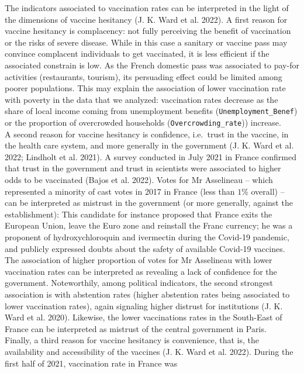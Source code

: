 \documentclass[
]{article}
\begin{document}
The indicators associated to vaccination rates can be interpreted in the
light of the dimensions of vaccine hesitancy (J. K. Ward et al. 2022). A
first reason for vaccine hesitancy is complacency: not fully perceiving
the benefit of vaccination or the risks of severe disease. While in this
case a sanitary or vaccine pass may convince complacent individuals to
get vaccinated, it is less efficient if the associated constrain is low.
As the French domestic pass was associated to pay-for activities
(restaurants, tourism), its persuading effect could be limited among
poorer populations. This may explain the association of lower
vaccination rate with poverty in the data that we analyzed: vaccination
rates decrease as the share of local income coming from unemployment
benefits (\texttt{Unemployment\_Benef}) or the proportion of overcrowded
households (\texttt{Overcrowding\_rate})) increase.\\
A second reason for vaccine hesitancy is confidence, i.e.~trust in the
vaccine, in the health care system, and more generally in the government
(J. K. Ward et al. 2022; Lindholt et al. 2021). A survey conducted in
July 2021 in France confirmed that trust in the government and trust in
scientists were associated to higher odds to be vaccinated (Bajos et al.
2022). Votes for Mr Asselineau -- which represented a minority of cast
votes in 2017 in France (less than \(1\%\) overall) -- can be
interpreted as mistrust in the government (or more generally, against
the establishment): This candidate for instance proposed that France
exits the European Union, leave the Euro zone and reinstall the Franc
currency; he was a proponent of hydroxychloroquin and ivermectin during
the Covid-19 pandemic, and publicly expressed doubts about the safety of
available Covid-19 vaccines. The association of higher proportion of
votes for Mr Asselineau with lower vaccination rates can be interpreted
as revealing a lack of confidence for the government. Noteworthily,
among political indicators, the second strongest association is with
abstention rates (higher abstention rates being associated to lower
vaccination rates), again signaling higher distrust for institutions (J.
K. Ward et al. 2020). Likewise, the lower vaccinations rates in the
South-East of France can be interpreted as mistrust of the central
government in Paris.\\
Finally, a third reason for vaccine hesitancy is convenience, that is,
the availability and accessibility of the vaccines (J. K. Ward et al.
2022). During the first half of 2021, vaccination rate in France was
\end{document}
